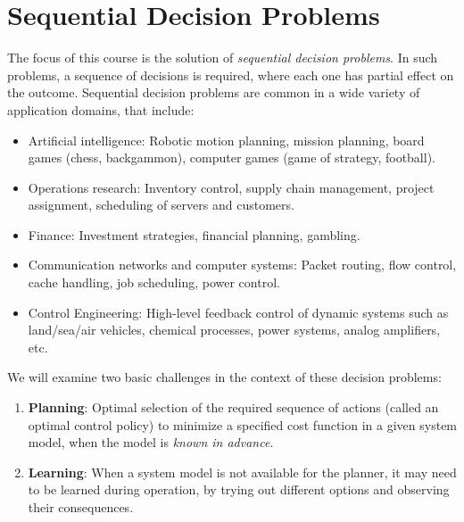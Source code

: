 %
%
%
%
%
%
%
%
\section{Sequential Decision Problems}
The focus of this course is the solution of \emph{sequential decision problems}.  In such problems, a sequence of decisions is required, where each one has partial effect on the outcome.
Sequential decision problems are common in a wide variety of application domains, that include:
\begin{itemize}
  \item Artificial intelligence: Robotic motion planning, mission planning, board games (chess, backgammon), computer games (game of strategy, football).
  \item Operations research:  Inventory control, supply chain management, project assignment, scheduling of servers and customers.
  \item Finance: Investment strategies, financial planning, gambling.
  \item Communication networks and computer systems: Packet routing, flow control, cache handling, job scheduling, power control.
  \item Control Engineering: High-level feedback control of dynamic systems such as land/sea/air vehicles, chemical processes, power systems, analog amplifiers, etc.
\end{itemize}

We will examine two basic challenges in the context  of these decision problems:
\begin{enumerate}
  \item \textbf{Planning}: Optimal selection of the required sequence of actions (called an optimal control policy) to minimize a specified cost function in a given system model, when the model is \emph{known in advance}.
  \item \textbf{Learning}: When a system model is not available for the planner, it may need to be learned during operation, by trying out different options and observing their consequences.
\end{enumerate}

